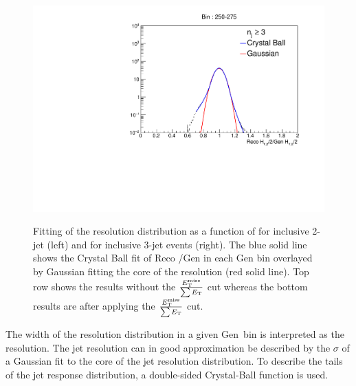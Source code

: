 \begin{figure}[!htbp]
\begin{center}
    \includegraphics[scale = 0.41]{Plots_HT_2_150/Fit_Res_3_final_crystal_genbin_250-275_crystal.pdf}\\
    \caption{Fitting of the resolution distribution as a function of \httwo for inclusive 2-jet (left) and for inclusive 3-jet events 
      (right). The blue solid line shows the Crystal Ball fit of Reco \httwo/Gen \httwo in each Gen \httwo bin overlayed by Gaussian fitting the core of the resolution (red solid line). Top row shows the results without the $\frac{\ETmiss}{\sum \ET}$ cut whereas the bottom results are after applying the $\frac{\ETmiss}{\sum \ET}$ cut.}
    \label{fig:fit_gauss}
  \end{center}
\end{figure}

The width of the resolution distribution in a given Gen~\httwo bin is interpreted as the resolution. The jet resolution can in good 
approximation be described by the $\sigma$ of a Gaussian fit to the core of the jet resolution distribution. To describe the tails of the jet response distribution, a double-sided Crystal-Ball function is used.%


